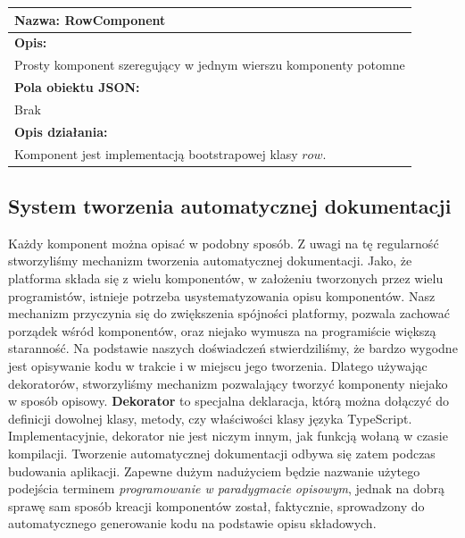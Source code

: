 \documentclass[licencjacka]{pracamgr}
\begin{document}
\vspace{60pt}

\begin{tabularx}{\linewidth}{|l|}\hline
\textbf{Nazwa:}
RowComponent
\\\hline
\textbf{Opis:}\\

Prosty komponent szeregujący w jednym wierszu komponenty potomne\\
\hline
\textbf{Pola obiektu JSON:} \\
Brak\\
\hline
\textbf{Opis działania:}\\
Komponent jest implementacją bootstrapowej klasy $row$.
\\\hline
\end{tabularx}

\subsection{System tworzenia automatycznej dokumentacji}
Każdy komponent można opisać w podobny sposób.
Z uwagi na tę regularność stworzyliśmy mechanizm tworzenia automatycznej dokumentacji.
Jako, że platforma składa się z wielu komponentów, w założeniu tworzonych przez wielu
programistów, istnieje potrzeba usystematyzowania opisu komponentów.
Nasz mechanizm przyczynia się do zwiększenia spójności platformy, pozwala zachować porządek
wśród komponentów, oraz niejako wymusza na programiście większą staranność.
Na podstawie naszych doświadczeń stwierdziliśmy, że bardzo wygodne jest opisywanie
kodu w trakcie i w miejscu jego tworzenia. Dlatego używając dekoratorów,
stworzyliśmy mechanizm pozwalający tworzyć komponenty niejako w sposób opisowy.
\textbf{Dekorator} to specjalna deklaracja, którą można dołączyć do definicji dowolnej klasy, metody, czy właściwości klasy języka TypeScript. Implementacyjnie, dekorator nie jest niczym innym, jak funkcją wołaną w czasie kompilacji. Tworzenie automatycznej dokumentacji odbywa się zatem podczas budowania aplikacji.
Zapewne dużym nadużyciem będzie nazwanie użytego podejścia terminem
\textit{programowanie w paradygmacie opisowym},
jednak na dobrą sprawę sam sposób kreacji komponentów został, faktycznie, sprowadzony do
automatycznego generowanie kodu na podstawie opisu składowych.
\end{document}
